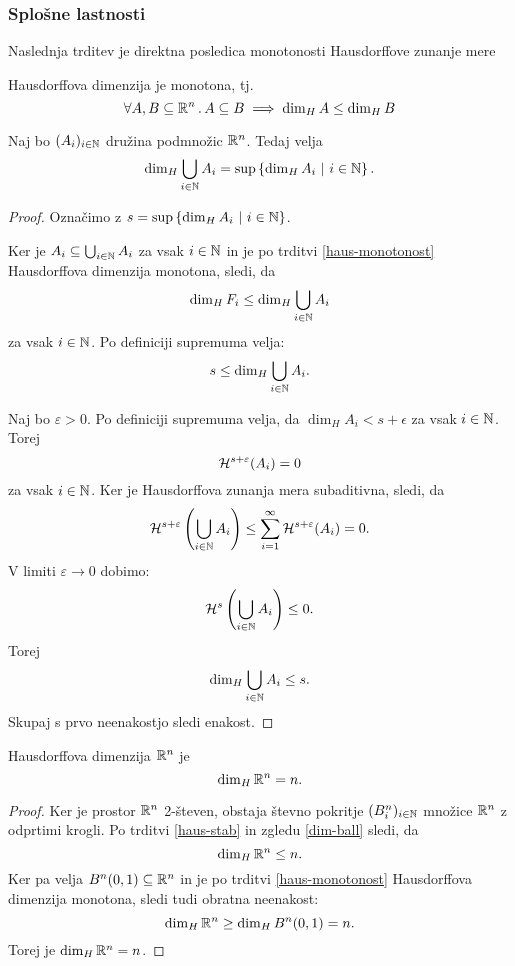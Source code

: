 \subsubsection{Splošne lastnosti}
Naslednja trditev je direktna posledica monotonosti Hausdorffove zunanje mere 

\begin{trditev}[Monotonost]
    \label{haus-monotonost}
    Hausdorffova dimenzija je monotona, tj.
    \[\forall A, B \subseteq \mathbb{R}^n \,.\, A \subseteq B \implies \dim_H A \leq \dim_H B\]
\end{trditev}

\begin{trditev}
    \label{haus-stab}
    Naj bo \((A_i)_{i \in \mathbb{N}}\) družina podmnožic \(\mathbb{R}^n\). Tedaj velja 
    \[\dim_H \bigcup_{i \in \mathbb{N}} A_i = \sup \left\{\dim_H A_i \ | \ i \in \mathbb{N}\right\}.\]
\end{trditev}

\begin{proof}
    Označimo z \(s = \sup \left\{\dim_H A_i \ | \ i \in \mathbb{N}\right\}\). 
    
    Ker je \(A_i \subseteq \bigcup_{i \in \mathbb{N}} A_i\) za vsak \(i \in \mathbb{N}\) in je po trditvi \ref{haus-monotonost} Hausdorffova dimenzija monotona, sledi, da
    \[\dim_H F_i \leq \dim_H \bigcup_{i \in \mathbb{N}} A_i\]
    za vsak \(i \in \mathbb{N}\). Po definiciji supremuma velja:
    \[s \leq \dim_H \bigcup_{i \in \mathbb{N}} A_i.\]

    Naj bo \(\varepsilon > 0\). Po definiciji supremuma velja, da \(\dim_H A_i < s + \epsilon\) za vsak \(i \in \mathbb{N}\). Torej 
    \[\mathcal{H}^{s + \varepsilon}(A_i) = 0\]
    za vsak \(i \in \mathbb{N}\). Ker je Hausdorffova zunanja mera subaditivna, sledi, da
    \[\mathcal{H}^{s + \varepsilon}\left(\bigcup_{i \in \mathbb{N}} A_i\right) \leq \sum_{i=1}^{\infty} \mathcal{H}^{s + \varepsilon} (A_i) = 0.\]
    V limiti \(\varepsilon \to 0\) dobimo:
    \[\mathcal{H}^s\left(\bigcup_{i \in \mathbb{N}} A_i\right) \leq 0.\]
    Torej 
    \[\dim_H \bigcup_{i \in \mathbb{N}} A_i \leq s.\]    
    Skupaj s prvo neenakostjo sledi enakost.
\end{proof}

\begin{posledica}
    \label{dim-rn}
    Hausdorffova dimenzija \(\mathbb{R}^n\) je 
    \[\dim_H \mathbb{R}^n = n.\]
\end{posledica}

\begin{proof}
    Ker je prostor \(\mathbb{R}^n\) 2-števen, obstaja števno pokritje \((B^n_i)_{i \in \mathbb{N}}\) množice \(\mathbb{R}^n\) z odprtimi krogli. Po trditvi \ref{haus-stab} in zgledu \ref{dim-ball} sledi, da
    \[\dim_H \mathbb{R}^n \leq n.\]
    Ker pa velja \(B^n(0, 1) \subseteq \mathbb{R}^n\) in je po trditvi \ref{haus-monotonost} Hausdorffova dimenzija monotona, sledi tudi obratna neenakost:
    \[
        \dim_H \mathbb{R}^n \geq \dim_H B^n(0, 1) = n.
    \]
    Torej je \(\dim_H \mathbb{R}^n = n\).
\end{proof}

